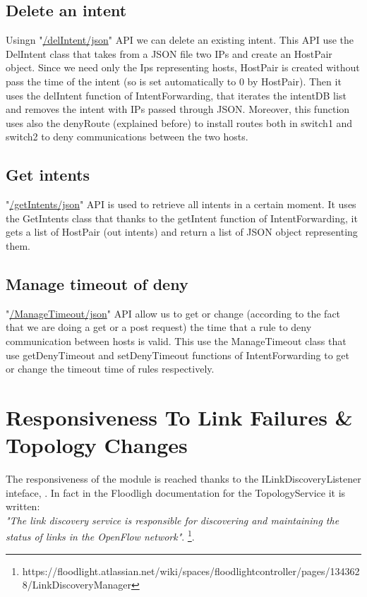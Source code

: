 \documentclass[a4paper]{report}
\begin{document}
	\subsection{Delete an intent}
	\noindent Usingn "\url{/delIntent/json}" API we can delete an existing intent. This API use the DelIntent class that takes from a JSON file two IPs and create an HostPair object. Since we need only the Ips representing hosts, HostPair is created without pass the time of the intent (so is set automatically to 0 by HostPair). Then it uses the delIntent function of IntentForwarding, that iterates the intentDB list and removes the intent with IPs passed through JSON. Moreover, this function uses also the denyRoute (explained before) to install routes both in switch1 and switch2 to deny communications between the two hosts.
        
        \subsection{Get intents}
        \noindent "\url{/getIntents/json}" API is used to retrieve all intents in a certain moment. It uses the GetIntents class that thanks to the getIntent function of IntentForwarding, it gets a list of HostPair (out intents) and return a list of JSON object representing them.

	\subsection{Manage timeout of deny}
        \noindent "\url{/ManageTimeout/json}" API allow us to get or change (according to the fact that we are doing a get or a post request) the time that a rule to deny communication between hosts is valid. This use the ManageTimeout class that use getDenyTimeout and setDenyTimeout functions of IntentForwarding to get or change the timeout time of rules respectively.

	
	\section{Responsiveness To Link Failures \& Topology Changes}
	The responsiveness of the module is reached thanks to the ILinkDiscoveryListener inteface, . 
	In fact in the Floodligh documentation for the TopologyService it is written: \\
	\textit{"The link discovery service is responsible for discovering and maintaining the status of links in the OpenFlow network"}.
	\footnote{https://floodlight.atlassian.net/wiki/spaces/floodlightcontroller/pages/1343628/LinkDiscoveryManager}.
	
\end{document}
